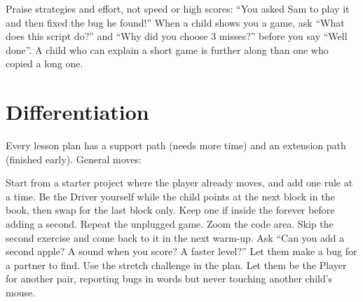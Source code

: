 \documentclass[track=junior,level=2,teacher]{kidscode}
\begin{document}
\begin{tip}
Praise strategies and effort, not speed or high scores: \enquote{You asked Sam to play it and then
fixed the bug he found!} When a child shows you a game, ask \enquote{What does this script do?} and
\enquote{Why did you choose 3 misses?} before you say \enquote{Well done}. A child who can explain
a short game is further along than one who copied a long one.
\end{tip}

\section{Differentiation}
Every lesson plan has a support path (needs more time) and an extension path (finished early).
General moves:

\begin{differentiation}
\supportpath Start from a starter project where the player already moves, and add one rule at a
time. Be the Driver yourself while the child points at the next block in the book, then swap for the
last block only. Keep one if inside the forever before adding a second. Repeat the unplugged game.
Zoom the code area. Skip the second exercise and come back to it in the next warm-up.
\extensionpath Ask \enquote{Can you add a second apple? A sound when you score? A faster level?}
Let them make a bug for a partner to find. Use the stretch challenge in the plan. Let them be the
Player for another pair, reporting bugs in words but never touching another child's mouse.
\end{differentiation}
\end{document}
